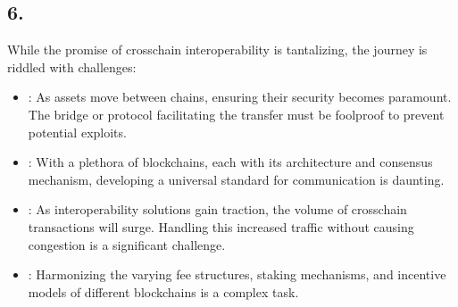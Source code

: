 \documentclass[letterpaper,10pt,english]{jupyterBook}
\begin{document}
\subsection{6. }
\label{\detokenize{Interoperability/Cross-Chain Interoperability:challenges-in-achieving-interoperability}}
\sphinxAtStartPar
While the promise of cross\sphinxhyphen{}chain interoperability is tantalizing, the journey is riddled with challenges:
\begin{itemize}
\item {} 
\sphinxAtStartPar
{}: As assets move between chains, ensuring their security becomes paramount. The bridge or protocol facilitating the transfer must be foolproof to prevent potential exploits.

\item {} 
\sphinxAtStartPar
{}: With a plethora of blockchains, each with its architecture and consensus mechanism, developing a universal standard for communication is daunting.

\item {} 
\sphinxAtStartPar
{}: As interoperability solutions gain traction, the volume of cross\sphinxhyphen{}chain transactions will surge. Handling this increased traffic without causing congestion is a significant challenge.

\item {} 
\sphinxAtStartPar
{}: Harmonizing the varying fee structures, staking mechanisms, and incentive models of different blockchains is a complex task.

\end{itemize}
\end{document}
